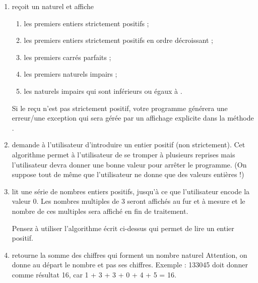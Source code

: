 \documentclass[11pt,a4paper]{article}
\begin{document}
					\begin{enumerate}
				
			\item re\c coit un naturel \verb@n@ et affiche
              
					\begin{enumerate}
				
			\item les \verb@n@ premiers entiers strictement positifs ;
			\item les \verb@n@ premiers entiers strictement positifs en ordre d\'ecroissant ;
			\item les \verb@n@ premiers carr\'es parfaits ;
			\item les \verb@n@ premiers naturels impairs ;
			\item les naturels impairs qui sont inf\'erieurs ou \'egaux \`a \verb@n@.
					\end{enumerate}
				
              Si le \verb@n@ re\c cu n'est pas strictement positif, votre programme g\'en\'erera une erreur/une exception 
              qui sera g\'er\'ee par un affichage explicite dans la m\'ethode \verb@main@.
            
			\item 
              demande \`a l'utilisateur d'introduire un entier positif (non strictement). 
              Cet algorithme permet \`a l'utilisateur de se tromper \`a plusieurs reprises mais l'utilisateur devra donner
              une bonne valeur pour arr\^eter le programme.
              (On suppose tout de m\^eme que l'utilisateur ne donne que des valeurs enti\`eres !) 
            
			\item 
              lit une s\'erie de nombres entiers positifs, jusqu'\`a ce que l'utilisateur
              encode la valeur 0. Les nombres multiples de 3 seront affich\'es au fur et \`a mesure et le nombre
              de ces multiples sera affich\'e en fin de traitement.
              
            \par
        
              Pensez \`a utiliser l'algorithme \'ecrit ci-dessus qui permet de lire un entier positif.
              
            \par
        
			\item 
              retourne la somme des chiffres qui forment un nombre naturel \verb@n@
              Attention, on donne au d\'epart le nombre et pas ses chiffres. Exemple : 133045 doit donner
              comme r\'esultat 16, car 1 + 3 + 3 + 0 + 4 + 5 = 16.
            

\end{enumerate}
\end{document}

